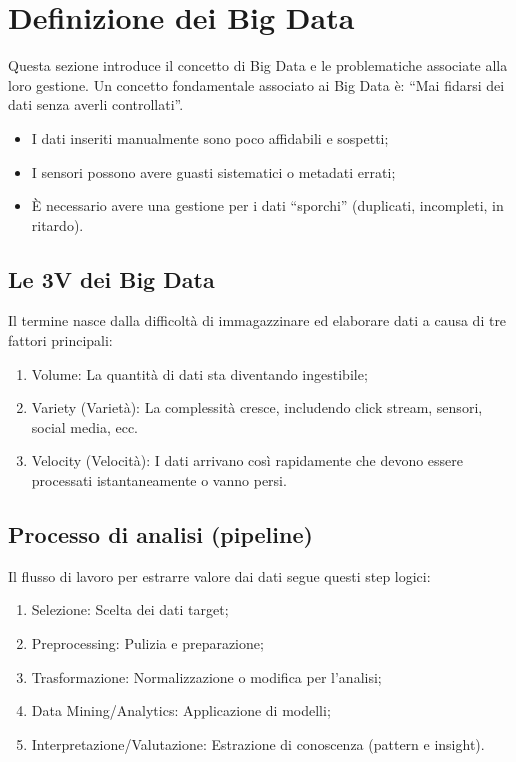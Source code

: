 %
%
\section{Definizione dei Big Data}
Questa sezione introduce il concetto di Big Data e le problematiche associate alla loro gestione.
Un concetto fondamentale associato ai Big Data è: ``Mai fidarsi dei dati senza averli controllati''.
\begin{itemize}
    \item I dati inseriti manualmente sono poco affidabili e sospetti;
    \item I sensori possono avere guasti sistematici o metadati errati;
    \item È necessario avere una gestione per i dati ``sporchi'' (duplicati, incompleti, in ritardo).
\end{itemize}
%
\subsection{Le 3V dei Big Data}
Il termine nasce dalla difficoltà di immagazzinare ed elaborare dati a causa di tre fattori principali:
\begin{enumerate}
    \item Volume: La quantità di dati sta diventando ingestibile;
    \item Variety (Varietà): La complessità cresce, includendo click stream, sensori, social media, ecc.
    \item Velocity (Velocità): I dati arrivano così rapidamente che devono essere processati istantaneamente o vanno persi.
\end{enumerate}
%
\subsection{Processo di analisi (pipeline)}
Il flusso di lavoro per estrarre valore dai dati segue questi step logici:
\begin{enumerate}
    \item Selezione: Scelta dei dati target;
    \item Preprocessing: Pulizia e preparazione;
    \item Trasformazione: Normalizzazione o modifica per l'analisi;
    \item Data Mining/Analytics: Applicazione di modelli;
    \item Interpretazione/Valutazione: Estrazione di conoscenza (pattern e insight).
\end{enumerate}

